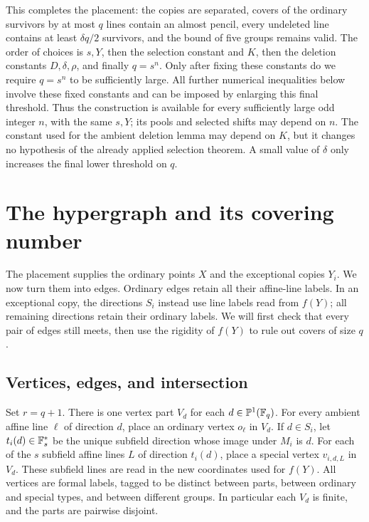 This completes the placement: the copies are separated, covers of the
ordinary survivors by at most \(q\) lines contain an almost pencil,
every undeleted line contains at least \(\delta q/2\) survivors,
and the bound of five groups remains valid.  The order of choices is
\(s,Y\), then the selection constant and \(K\), then the deletion
constants \(D,\delta,\rho\), and finally \(q=s^n\).
Only after fixing these constants do we require \(q=s^n\) to be
sufficiently large.  All further numerical inequalities below involve
these fixed constants
and can be imposed by enlarging this final threshold.  Thus the
construction is available for every sufficiently large odd integer
\(n\), with the same \(s,Y\); its pools and selected shifts may
depend on \(n\). The constant used for the ambient deletion lemma
may depend on \(K\), but it changes no hypothesis of the already
applied selection theorem. A small value of \(\delta\) only increases
the final lower threshold on \(q\).

\section{The hypergraph and its covering number}
\label{sec:hypergraph}

The placement supplies the ordinary points \(X\) and the exceptional
copies \(Y_i\).  We now turn them into edges.  Ordinary edges retain
all their affine-line labels.  In an exceptional copy, the directions
\(S_i\) instead use line labels read from \(f(Y)\); all remaining
directions retain their ordinary labels.  We will first check that
every pair of edges still meets, then use the rigidity of \(f(Y)\)
to rule out covers of size \(q\).

\subsection{Vertices, edges, and intersection}

Set \(r=q+1\).  There is one vertex part \(V_d\) for each
\(d\in\mathbb P^1(\mathbb F_q)\).  For every ambient affine line \(\ell\)
of direction \(d\), place an ordinary vertex \(o_\ell\) in
\(V_d\).  If \(d\in S_i\), let \(t_i(d)\in\mathbb F_s^*\) be
the unique subfield direction whose image under \(M_i\) is
\(d\).  For each of the \(s\) subfield affine lines \(L\) of
direction \(t_i(d)\), place a special vertex \(v_{i,d,L}\) in
\(V_d\).  These subfield lines are read in the new coordinates
used for \(f(Y)\).  All vertices are formal labels, tagged to be
distinct between parts, between ordinary and special types, and
between different groups.  In particular each \(V_d\) is finite,
and the parts are pairwise disjoint.

